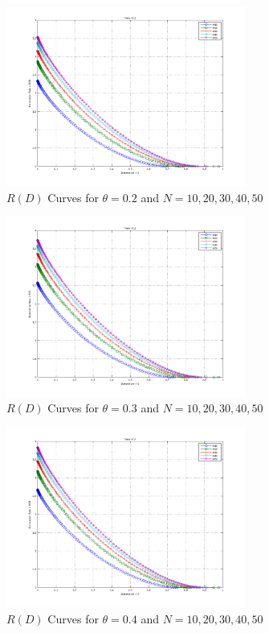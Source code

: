 \documentclass[journal]{IEEEtran}
\begin{document}
\begin{figure}[!h]
\centering
\includegraphics[width=3.1in]{../images/plot_2.png}
\caption{\(R(D)\) Curves for \(\theta=0.2\) and \(N={ {10,20,30,40,50} }\)}
\label{fig:theta_2}
\end{figure}

\begin{figure}[!h]
\centering
\includegraphics[width=3.1in]{../images/plot_3.png}
\caption{\(R(D)\) Curves for \(\theta=0.3\) and \(N={ {10,20,30,40,50} }\)}
\label{fig:theta_3}
\end{figure}

\begin{figure}[!h]
\centering
\includegraphics[width=3.1in]{../images/plot_4.png}
\caption{\(R(D)\) Curves for \(\theta=0.4\) and \(N={ {10,20,30,40,50} }\)}
\label{fig:theta_4}
\end{figure}
\end{document}

